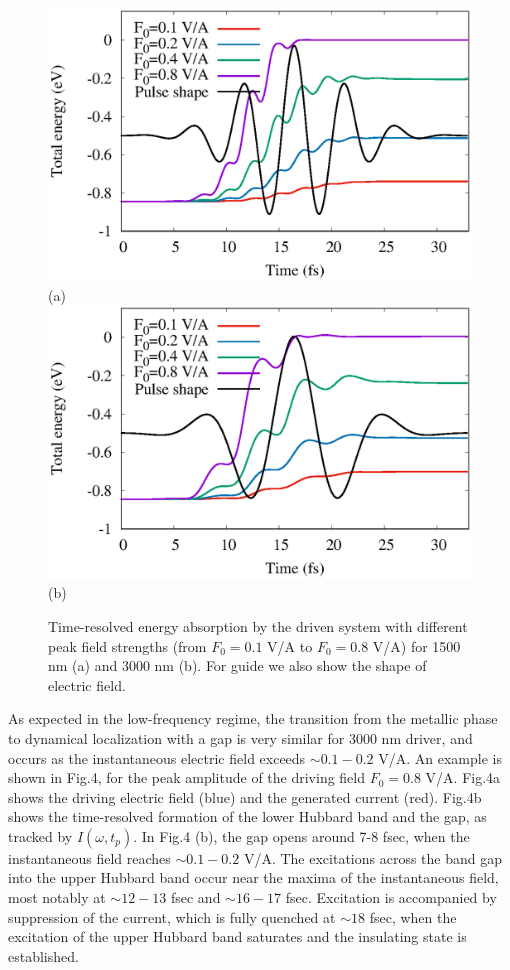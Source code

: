 \documentclass[prb,aps,twocolumn,showpacs,amsmath,amssymb]{revtex4}%
\newcommand{\w}{\omega}
\begin{document}
\begin{figure}[h!]
 \includegraphics[width=0.9\linewidth,angle=0]{Etot_w192.eps}(a)
 \includegraphics[width=0.9\linewidth,angle=0]{Etot_w0961.eps}(b)
\caption{Time-resolved energy absorption by the 
driven system with different peak field strengths (from $F_0=0.1$ V/A to  $F_0=0.8$ V/A)
for 1500 nm (a) and 3000 nm (b). For guide we also show the shape of electric field.}
\label{Fig3}  
\end{figure}

As expected in the low-frequency regime,  the
transition  from the 
metallic phase to dynamical localization with
a gap is very similar for 3000 nm driver, and 
occurs as the instantaneous 
electric field exceeds $\sim 0.1-0.2$ V/A. An example
is shown in Fig.4, for the peak amplitude
of the driving field $F_{0}=0.8$ V/A.
Fig.4a shows the driving electric field
(blue) and the generated current (red). Fig.4b shows 
the time-resolved formation of the 
lower Hubbard band and the gap, as tracked by 
$I(\w, t_p)$. In Fig.4 (b), the gap opens around 7-8 fsec, 
when the instantaneous field reaches $\sim 0.1-0.2$ V/A. 
The excitations across the band gap into the upper Hubbard 
band occur near the maxima of the instantaneous 
field, most notably at $\sim 12-13$ fsec and $\sim 16-17$ fsec.
Excitation is accompanied by 
suppression of the current, which is fully quenched 
at $\sim 18$ fsec, when the excitation of the upper Hubbard band 
saturates and the insulating state is established. 
\end{document}

